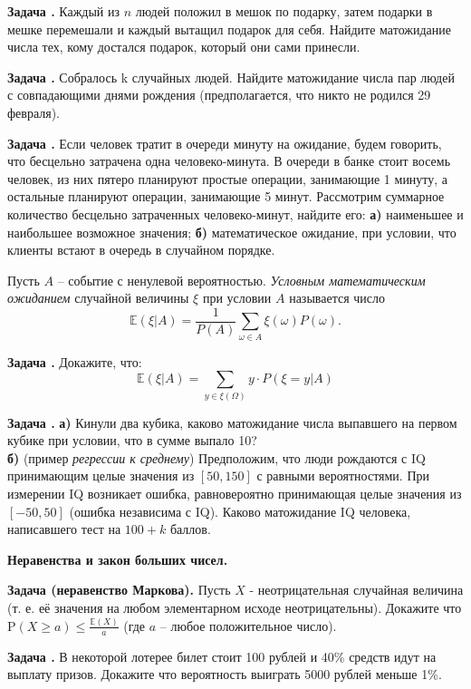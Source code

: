 \documentclass[11pt,a4paper]{article}
\def\E{\mathrm{\mathbb{E}}}
\def\P{\mathrm{P}}
\newcounter{znum}
\newcommand{\z}[1]{\addtocounter{znum}{1} \textbf{Задача \arabic{znum}#1. }}
\renewcommand{\!}{\textcolor{red}{!}}
\begin{document}
\vspace{0.2cm}

\z{} Каждый из $n$ людей положил в мешок по подарку, затем подарки в мешке перемешали и каждый вытащил подарок для себя. Найдите матожидание числа тех, кому достался подарок, который они сами принесли.

\z{} Собралось k случайных людей. Найдите матожидание числа пар людей с совпадающими днями рождения (предполагается, что никто не родился 29 февраля).

\z{} Если человек тратит в очереди минуту на ожидание, будем говорить, что бесцельно затрачена одна человеко-минута. В очереди в банке стоит восемь человек, из них пятеро планируют простые операции, занимающие 1 минуту, а остальные планируют операции, занимающие 5 минут. Рассмотрим суммарное количество бесцельно затраченных человеко-минут, найдите его:
\textbf{а)} наименьшее и наибольшее возможное значения;
\textbf{б)} математическое ожидание, при условии, что клиенты встают в очередь в случайном порядке.

\vspace{0.5cm}

Пусть $A$ -- событие с ненулевой вероятностью. \emph{Условным математическим ожиданием} случайной величины $\xi$ при условии $A$ называется число
$$\E(\xi | A) = \frac{1}{P(A)} \sum_{\omega \in A} \xi(\omega) P(\omega).$$

\z{} Докажите, что:
$$ \E(\xi | A) = \sum_{y \in \xi(\Omega)} y \cdot P(\xi = y | A)$$

\z{}
\textbf{а)} Кинули два кубика, каково матожидание числа выпавшего на первом кубике при условии, что в сумме выпало 10?\\
\textbf{б)} (пример \emph{регрессии к среднему}) Предположим, что люди рождаются с IQ принимающим целые значения из $[50, 150]$ с равными вероятностями. При измерении IQ возникает ошибка, равновероятно принимающая целые значения из $[-50, 50]$ (ошибка независима с IQ). Каково матожидание IQ человека, написавшего тест на $100 + k$ баллов.


\begin{center}
	\large
	\textbf{Неравенства и закон больших чисел.}
\end{center}

\z{ (неравенство Маркова)} Пусть $X$ - неотрицательная случайная величина (т. е. её значения на любом элементарном исходе неотрицательны). Докажите что $\P(X \geqslant a) \leqslant \frac{\E(X)}{a}$ (где $a$ -- любое положительное число).

\z{} В некоторой лотерее билет стоит 100 рублей и 40\% средств идут на выплату призов. Докажите что вероятность выиграть 5000 рублей меньше 1\%.
\end{document}
